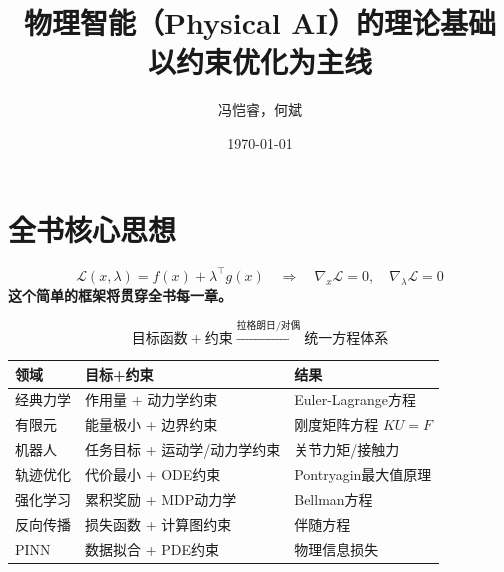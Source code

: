 \documentclass[11pt,a4paper,twoside,openright]{book}
\title{
    \vspace{-2cm}
    {\Huge\bfseries 物理智能（Physical AI）的理论基础} \\[0.8cm]
    {\Large 以约束优化为主线} \\[1cm]
}
\author{冯恺睿，何斌}
\date{\today}
\theoremstyle{definition}
\newcommand{\Lag}{\mathcal{L}}
\begin{document}
\maketitle



\setcounter{tocdepth}{1}   %
\tableofcontents

\chapter*{全书核心思想}

\begin{keyformula}[title=统一框架]
\begin{equation}
\boxed{
\Lag(x, \lambda) = f(x) + \lambda^\top g(x) \quad \Rightarrow \quad \nabla_x \Lag = 0, \quad \nabla_\lambda \Lag = 0
}
\end{equation}
\textbf{这个简单的框架将贯穿全书每一章。}
\end{keyformula}

\vspace{1cm}

\begin{unification}[title=各领域的统一模板]
\[
\text{目标函数} + \text{约束} \xrightarrow{\text{拉格朗日/对偶}} \text{统一方程体系}
\]

\begin{center}
\small
\begin{tabular}{lll}
\toprule
\textbf{领域} & \textbf{目标+约束} & \textbf{结果} \\
\midrule
经典力学 & 作用量 + 动力学约束 & Euler-Lagrange方程 \\
有限元 & 能量极小 + 边界约束 & 刚度矩阵方程 $KU=F$ \\
机器人 & 任务目标 + 运动学/动力学约束 & 关节力矩/接触力 \\
轨迹优化 & 代价最小 + ODE约束 & Pontryagin最大值原理 \\
强化学习 & 累积奖励 + MDP动力学 & Bellman方程 \\
反向传播 & 损失函数 + 计算图约束 & 伴随方程 \\
PINN & 数据拟合 + PDE约束 & 物理信息损失 \\
\bottomrule
\end{tabular}
\end{center}
\end{unification}
\end{document}
